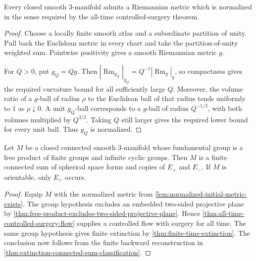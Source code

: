 \begin{lemma}
\label{lem:normalized-initial-metric-exists}
\notready
Every closed smooth $3$-manifold admits a Riemannian metric which is normalized
in the sense required by the all-time controlled-surgery theorem.
\end{lemma}

\begin{proof}
Choose a locally finite smooth atlas and a subordinate partition of unity.
Pull back the Euclidean metric in every chart and take the partition-of-unity
weighted sum.  Pointwise positivity gives a smooth Riemannian metric $g$.

For $Q>0$, put $g_Q=Qg$.  Then
$|\operatorname{Rm}_{g_Q}|_{g_Q}=Q^{-1}|\operatorname{Rm}_g|_g$, so compactness
gives the required curvature bound for all sufficiently large $Q$.  Moreover,
the volume ratio of a $g$-ball of radius $\rho$ to the Euclidean ball of that
radius tends uniformly to $1$ as $\rho\downarrow0$.  A unit $g_Q$-ball
corresponds to a $g$-ball of radius $Q^{-1/2}$, with both volumes multiplied by
$Q^{3/2}$.  Taking $Q$ still larger gives the required lower bound for every
unit ball.  Thus $g_Q$ is normalized.
\end{proof}

\begin{theorem}
\label{thm:free-product-connected-sum-classification}
\notready
Let $M$ be a closed connected smooth $3$-manifold whose fundamental group is
a free product of finite groups and infinite cyclic groups.  Then $M$ is a
finite connected sum of spherical space forms and copies of $E_+$ and $E_-$.
If $M$ is orientable, only $E_+$ occurs.
\end{theorem}

\begin{proof}
Equip $M$ with the normalized metric from
\ref{lem:normalized-initial-metric-exists}.  The group hypothesis excludes an
embedded two-sided projective plane by
\ref{thm:free-product-excludes-two-sided-projective-plane}.  Hence
\ref{thm:all-time-controlled-surgery-flow} supplies a controlled flow with
surgery for all time.  The same group hypothesis gives finite extinction by
\ref{thm:finite-time-extinction}.  The conclusion now follows from the finite
backward reconstruction in
\ref{thm:extinction-connected-sum-classification}.
\end{proof}

